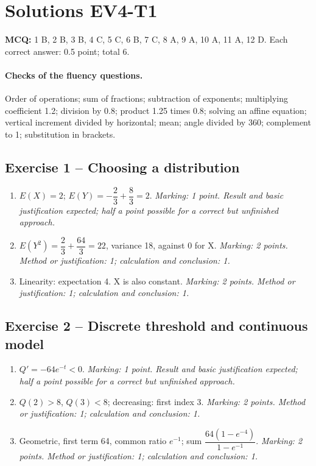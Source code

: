 \mxnewpage\section*{Solutions EV4-T1}\label{EV4-T1-CORR}
\textbf{MCQ:} 1 B, 2 B, 3 B, 4 C, 5 C, 6 B, 7 C, 8 A, 9 A, 10 A, 11 A, 12 D. Each correct answer: \num{0,5} point; total 6.
\paragraph{Checks of the fluency questions.} Order of operations; sum of fractions; subtraction of exponents; multiplying coefficient \num{1,2}; division by \num{0,8}; product \num{1,25} times \num{0,8}; solving an affine equation; vertical increment divided by horizontal; mean; angle divided by 360; complement to 1; substitution in brackets.
\subsection*{Exercise 1 -- Choosing a distribution}
\begin{enumerate}
\item $E(X)=2$; $E(Y)=-\dfrac{2}{3}+\dfrac{8}{3}=2$. \textit{Marking: 1 point. Result and basic justification expected; half a point possible for a correct but unfinished approach.}
\item $E(Y^2)=\dfrac{2}{3}+\dfrac{64}{3}=22$, variance 18, against 0 for X. \textit{Marking: 2 points. Method or justification: 1; calculation and conclusion: 1.}
\item Linearity: expectation 4. X is also constant. \textit{Marking: 2 points. Method or justification: 1; calculation and conclusion: 1.}
\end{enumerate}
\subsection*{Exercise 2 -- Discrete threshold and continuous model}
\begin{enumerate}
\item $Q\prime=-64e^{-t}<0$. \textit{Marking: 1 point. Result and basic justification expected; half a point possible for a correct but unfinished approach.}
\item $Q(2)>8$, $Q(3)<8$; decreasing: first index 3. \textit{Marking: 2 points. Method or justification: 1; calculation and conclusion: 1.}
\item Geometric, first term 64, common ratio $e^{-1}$; sum $\dfrac{64(1-e^{-4})}{1-e^{-1}}$. \textit{Marking: 2 points. Method or justification: 1; calculation and conclusion: 1.}
\end{enumerate}
